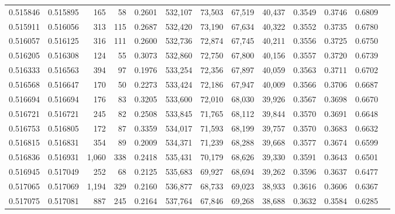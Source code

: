 \begin{tabular}{rrrrrrrrrrrrr}
0.515846 & 0.515895 &   165 &    58 &                                     0.2601 & 532,107 &  73,503 &  67,519 &  40,437 & 0.3549 & 0.3746 & 0.6809 \\
0.515911 & 0.516056 &   313 &   115 &                                     0.2687 & 532,420 &  73,190 &  67,634 &  40,322 & 0.3552 & 0.3735 & 0.6780 \\
0.516057 & 0.516125 &   316 &   111 &                                     0.2600 & 532,736 &  72,874 &  67,745 &  40,211 & 0.3556 & 0.3725 & 0.6750 \\
0.516205 & 0.516308 &   124 &    55 &                                     0.3073 & 532,860 &  72,750 &  67,800 &  40,156 & 0.3557 & 0.3720 & 0.6739 \\
0.516333 & 0.516563 &   394 &    97 &                                     0.1976 & 533,254 &  72,356 &  67,897 &  40,059 & 0.3563 & 0.3711 & 0.6702 \\
0.516568 & 0.516647 &   170 &    50 &                                     0.2273 & 533,424 &  72,186 &  67,947 &  40,009 & 0.3566 & 0.3706 & 0.6687 \\
0.516694 & 0.516694 &   176 &    83 &                                     0.3205 & 533,600 &  72,010 &  68,030 &  39,926 & 0.3567 & 0.3698 & 0.6670 \\
0.516721 & 0.516721 &   245 &    82 &                                     0.2508 & 533,845 &  71,765 &  68,112 &  39,844 & 0.3570 & 0.3691 & 0.6648 \\
0.516753 & 0.516805 &   172 &    87 &                                     0.3359 & 534,017 &  71,593 &  68,199 &  39,757 & 0.3570 & 0.3683 & 0.6632 \\
0.516815 & 0.516831 &   354 &    89 &                                     0.2009 & 534,371 &  71,239 &  68,288 &  39,668 & 0.3577 & 0.3674 & 0.6599 \\
0.516836 & 0.516931 & 1,060 &   338 &                                     0.2418 & 535,431 &  70,179 &  68,626 &  39,330 & 0.3591 & 0.3643 & 0.6501 \\
0.516945 & 0.517049 &   252 &    68 &                                     0.2125 & 535,683 &  69,927 &  68,694 &  39,262 & 0.3596 & 0.3637 & 0.6477 \\
0.517065 & 0.517069 & 1,194 &   329 &                                     0.2160 & 536,877 &  68,733 &  69,023 &  38,933 & 0.3616 & 0.3606 & 0.6367 \\
0.517075 & 0.517081 &   887 &   245 &                                     0.2164 & 537,764 &  67,846 &  69,268 &  38,688 & 0.3632 & 0.3584 & 0.6285 \\

\end{tabular}
